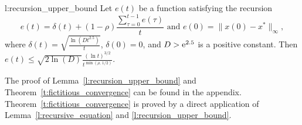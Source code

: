 \begin{replemma}{l:recursion_upper_bound}
  Let $e(t)$ be a function satisfying the recursion
  \[
    e(t) =
    \delta(t) + (1-\rho)\frac{\sum_{\tau=0}^{t-1}e(\tau)}{t}
    \text{ and } e(0)=\|x(0) - x^*\|_{\infty},
  \]
  where \(\delta(t) = \sqrt{\frac{\ln(D t^{2.5})}{t}} \), \(\delta(0) = 0 \),
  and $D > \mathrm{e}^{2.5}$ is a positive constant.  Then
  \(
    e(t) \leq
    \sqrt{2 \ln(D)} \frac{(\ln t)^{3/2}}{t^{\min(\rho,\, 1/2)}}.
  \)
\end{replemma}
\noindent The proof of Lemma~\ref{l:recursion_upper_bound}
and Theorem~\ref{t:fictitious_convergence}
can be found in the appendix. Theorem~\ref{t:fictitious_convergence}
is proved by a direct application of Lemma~\ref{l:recursive_equation}
and \ref{l:recursion_upper_bound}.
